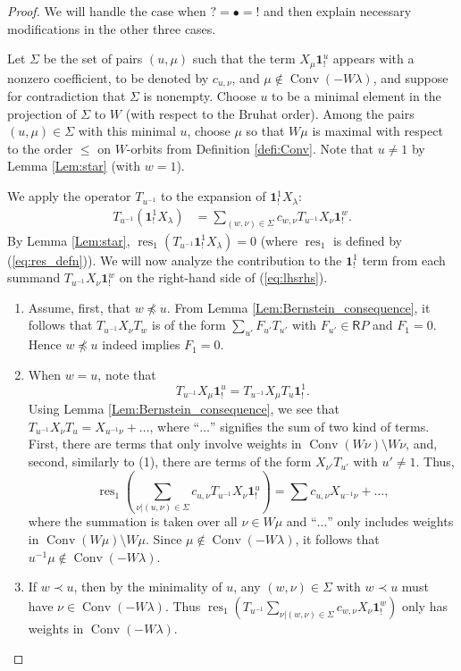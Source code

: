 \documentclass{amsart}
\newcommand{\Ring}{\mathsf{R}}
\newcommand{\bone}{\mathbf{1}}
\theoremstyle{definition}
\numberwithin{equation}{section}
\begin{document}
\begin{proof}
We will handle the case when $?=\bullet=!$ and then explain necessary modifications in the other three cases.

Let $\Sigma$ be the set of pairs $(u, \mu)$ such that the term $X_\mu \bone_!^u$ appears with a nonzero coefficient, { to be denoted by $c_{u,\nu}$}, and $\mu \notin \operatorname{Conv}(-W\lambda)$, and suppose for contradiction that $\Sigma$ is nonempty. Choose $u$ to be a minimal element in the projection of $\Sigma$ to $W$ (with respect to the Bruhat order). Among the pairs $(u, \mu) \in \Sigma$ with this minimal $u$, choose $\mu$ so that $W\mu$ is maximal with respect to the order $\leqslant$ on $W$-orbits from Definition \ref{defi:Conv}. Note that $u \neq 1$ by Lemma \ref{Lem:star} (with $w=1$).

We apply the operator $T_{u^{-1}}$ to the expansion of $\bone_!^1 X_\lambda$:
\begin{align}
    T_{u^{-1}} (\bone_!^1 X_\lambda) & = \sum_{(w, \nu) \in \Sigma} c_{w,\nu} T_{u^{-1}} X_\nu \bone_!^w.\label{eq:lhsrhs}
\end{align}
By Lemma \ref{Lem:star},  $\operatorname{res}_1(T_{u^{-1}}\bone_!^1 X_\lambda)=0$ (where $\operatorname{res}_1$ is defined by (\ref{eq:res_defn})).
We will now analyze the contribution to the $\bone_!^1$ term from each summand $T_{u^{-1}} X_\nu \bone_!^w$ on the right-hand side of (\ref{eq:lhsrhs}).
\begin{enumerate}
\item Assume, first, that $w\not\preceq u$. { From Lemma \ref{Lem:Bernstein_consequence}, it follows that}   $T_{u^{-1}}X_{\nu}T_w$ is of the form $\sum_{u'}F_{u'}T_{u'}$ with $F_{u'}\in \Ring P$ and $F_1=0$.  Hence $w\not\preceq u$ indeed implies $F_1=0$.
    \item When $w = u$, note that
    \[
    T_{u^{-1}} X_\mu \bone_!^u = T_{u^{-1}} X_\mu T_u \bone_!^1.
    \]
    Using Lemma \ref{Lem:Bernstein_consequence}, we see that $T_{u^{-1}} X_\nu T_u=X_{u^{-1}\nu}+\ldots$, where ``$\ldots$'' signifies the sum of two kind of terms. First, there are terms that only involve weights in $\operatorname{Conv}(W\nu)\setminus W\nu$, and, second, similarly to (1), there are terms of the form $X_{\nu'}T_{u'}$ with $u'\neq 1$.
    Thus, $$\operatorname{res}_1(\sum_{\nu| (u,\nu)\in \Sigma}c_{u,\nu}T_{u^{-1}}X_\nu\bone^u_!)= \sum c_{u,\nu}X_{u^{-1}\nu}+\ldots,$$
    where the summation is taken over all $\nu\in W\mu$ and ``$\ldots$'' only includes weights in $\operatorname{Conv}(W\mu)\setminus W\mu$.
    Since $\mu \notin \operatorname{Conv}(-W\lambda)$, it follows that $u^{-1}\mu \notin \operatorname{Conv}(-W\lambda)$.
    \item If $w \prec u$, then by the minimality of $u$, any $(w, \nu) \in \Sigma$ with $w \prec u$ must have $\nu \in \operatorname{Conv}(-W\lambda)$. Thus $\operatorname{res}_1(T_{u^{-1}}\sum_{\nu| (w,\nu)\in \Sigma}c_{w,\nu}X_\nu \bone^w_!)$ only has weights in  $\operatorname{Conv}(-W\lambda)$.
\end{enumerate}


\end{proof}
\end{document}
